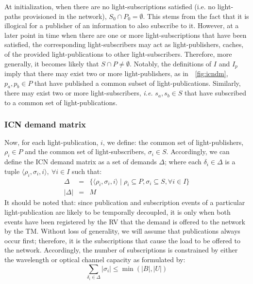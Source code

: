 \documentclass[journal]{IEEEtran}
\begin{document}
At initialization, when there are no light-subscriptions
satisfied (i.e. no light-paths provisioned in the network), $S_0 \cap
P_0 = \emptyset$. This stems from the fact that it is illogical for a
publisher of an information to also subscribe to it. However, at a
later point in time when there are one or more light-subscriptions
that have been satisfied, the corresponding light-subscribers may act
as light-publishers, caches, of the provided light-publications to other
light-subscribers. Therefore, more generally, it becomes likely that
$S \cap P \neq \emptyset$. 
Notably, the definitions of $I$ and $I_p$ imply that there may exist two or more light-publishers, as in~\figurename~\ref{fig:icndm}, $p_a, p_b \in P$ that have published a common subset of light-publications. Similarly, there may exist two or more light-subscribers, \emph{i.e.} $s_a, s_b \in S$ that have subscribed to a common set of light-publications. 
 
\subsubsection{ICN demand matrix}
\label{sec:icn-demand-matrix}

Now, for each light-publication, $i$, we define: the common set of
light-publishers, $\rho_i \in P$ and the common set of light-subscribers,
$\sigma_i \in S$. Accordingly, we can define the ICN demand matrix as a set of demands $\Delta$; where each $\delta_i \in \Delta$ is a tuple $\langle \rho_i, \sigma_i, i \rangle, \ \forall i \in I$ such that: 
\begin{eqnarray}
\Delta & = & \{\langle \rho_i, \sigma_i, i \rangle \mid \rho_i \subseteq P, \sigma_i \subseteq S, \forall i \in I \}
\\
|\Delta| &=&  M\nonumber
\end{eqnarray}
It should be noted that: since publication and subscription events of
a particular light-publication are
likely to be temporally decoupled, it is only when both events have
been registered by the RV that the demand is offered to the network by
the TM. Without loss of generality, we will assume that publications always
occur first; therefore, it is the subscriptions that cause the load to be offered to the
network. Accordingly, the number of subscriptions is constrained by
either the wavelength or optical channel capacity as formulated by:
\begin{equation*}
\sum_{\delta_i \in \Delta}|\sigma_i| \leq \min(|B|, |U|)\label{eq:sigma_con}
\end{equation*}
\end{document}
